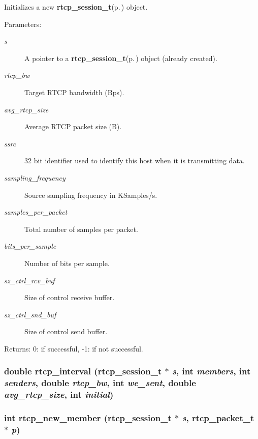 Initializes a new {\bf rtcp\_\-session\_\-t}{\rm (p.\,\pageref{structrtcp__session__t})} object. \begin{Desc}
\item[Parameters:]
\begin{description}
\item[{\em s}]A pointer to a {\bf rtcp\_\-session\_\-t}{\rm (p.\,\pageref{structrtcp__session__t})} object (already created). \item[{\em rtcp\_\-bw}]Target RTCP bandwidth (Bps). \item[{\em avg\_\-rtcp\_\-size}]Average RTCP packet size (B). \item[{\em ssrc}]32 bit identifier used to identify this host when it is transmitting data. \item[{\em sampling\_\-frequency}]Source sampling frequency in KSamples/s. \item[{\em samples\_\-per\_\-packet}]Total number of samples per packet. \item[{\em bits\_\-per\_\-sample}]Number of bits per sample. \item[{\em sz\_\-ctrl\_\-rcv\_\-buf}]Size of control receive buffer. \item[{\em sz\_\-ctrl\_\-snd\_\-buf}]Size of control send buffer. \end{description}
\end{Desc}
\begin{Desc}
\item[Returns:]0: if successful, -1: if not successful. \end{Desc}
\subsubsection{\setlength{\rightskip}{0pt plus 5cm}double rtcp\_\-interval ({\bf rtcp\_\-session\_\-t} $\ast$ {\em s}, int {\em members}, int {\em senders}, double {\em rtcp\_\-bw}, int {\em we\_\-sent}, double {\em avg\_\-rtcp\_\-size}, int {\em initial})\hspace{0.3cm}{\tt  [static]}}\label{rtcp_8h_a17}


\subsubsection{\setlength{\rightskip}{0pt plus 5cm}int rtcp\_\-new\_\-member ({\bf rtcp\_\-session\_\-t} $\ast$ {\em s}, {\bf rtcp\_\-packet\_\-t} $\ast$ {\em p})\hspace{0.3cm}{\tt  [static]}}\label{rtcp_8h_a4}


